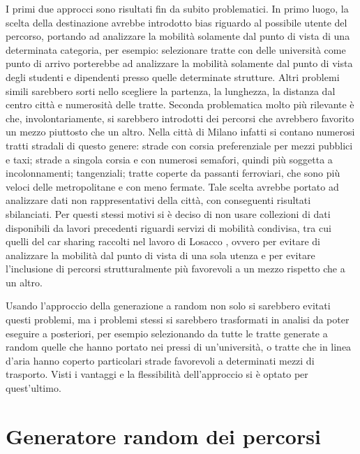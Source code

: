 I primi due approcci sono risultati fin da subito problematici. In primo luogo, la scelta della destinazione avrebbe introdotto bias riguardo al possibile utente del percorso, portando ad analizzare la mobilità solamente dal punto di vista di una determinata categoria, per esempio: selezionare tratte con delle università come punto di arrivo porterebbe ad analizzare la mobilità solamente dal punto di vista degli studenti e dipendenti presso quelle determinate strutture. Altri problemi simili sarebbero sorti nello scegliere la partenza, la lunghezza, la distanza dal centro città e numerosità delle tratte. Seconda problematica molto più rilevante è che, involontariamente, si sarebbero introdotti dei percorsi che avrebbero favorito un mezzo piuttosto che un altro. Nella città di Milano infatti si contano numerosi tratti stradali di questo genere: strade con corsia preferenziale per mezzi pubblici e taxi; strade a singola corsia e con numerosi semafori, quindi più soggetta a incolonnamenti; tangenziali; tratte coperte da passanti ferroviari, che sono più veloci delle metropolitane e con meno fermate. Tale scelta avrebbe portato ad analizzare dati non rappresentativi della città, con conseguenti risultati sbilanciati. Per questi stessi motivi si è deciso di non usare collezioni di dati disponibili da lavori precedenti riguardi servizi di mobilità condivisa, tra cui quelli del car sharing raccolti nel lavoro di Losacco \cite{trentini2017sampling}, ovvero per evitare di analizzare la mobilità dal punto di vista di una sola utenza e per evitare l'inclusione di percorsi strutturalmente più favorevoli a un mezzo rispetto che a un altro.

Usando l'approccio della generazione a random non solo si sarebbero evitati questi problemi, ma i problemi stessi si sarebbero trasformati in analisi da poter eseguire a posteriori, per esempio selezionando da tutte le tratte generate a random quelle che hanno portato nei pressi di un'università, o tratte che in linea d'aria hanno coperto particolari strade favorevoli a determinati mezzi di trasporto. Visti i vantaggi e la flessibilità dell'approccio si è optato per quest'ultimo.

\section{Generatore random dei percorsi}

